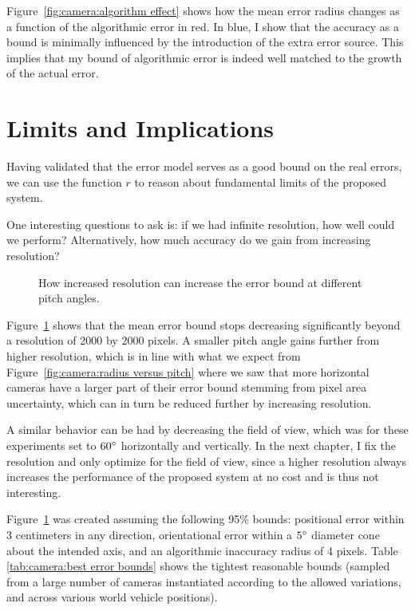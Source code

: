 \documentclass[a4paper,12pt,twoside,openright]{report}
\begin{document}
Figure~\ref{fig:camera:algorithm effect} shows how the mean error radius changes as a function of the 
algorithmic error in red. In blue, I show that the accuracy as a bound is minimally influenced 
by the introduction of the extra error source. This implies that my bound of
algorithmic error is indeed well matched to the growth of the actual error.


\section{Limits and Implications}
\label{sec:camera:implications}

Having validated that the error model serves as a good bound on the real errors, we can use the function $r$
to reason about fundamental limits of the proposed system.

One interesting questions to ask is: if we had infinite resolution,
how well could we perform? Alternatively, how much accuracy do we gain from increasing resolution?

\begin{figure}[htb]
    \begin{center}
        
    \end{center}
    \caption[Resolution Limits]{How increased resolution can increase the error bound at different pitch angles.}
    \label{fig:camera:resolution}
\end{figure}

Figure~\ref{fig:camera:resolution} shows that the mean error bound stops decreasing
significantly beyond a resolution of 2000 by 2000 pixels. A smaller pitch 
angle gains further from higher resolution, which is in line with what we 
expect from Figure~\ref{fig:camera:radius versus pitch} where we saw that more horizontal cameras
have a larger part of their error bound stemming from pixel area uncertainty,
which can in turn be reduced further by increasing resolution.

A similar behavior can be had by decreasing the field of view, which was for
these experiments set to $60\degree$ horizontally and vertically. 
In the next chapter, I fix the resolution and only optimize for the field of view,
since a higher resolution always increases the performance
of the proposed system at no cost and is thus not interesting.

Figure~\ref{fig:camera:resolution} was created assuming the following 95\% bounds: positional error
within 3 centimeters in any direction, orientational error within a
$5\degree$ diameter cone about the intended axis, 
and an algorithmic inaccuracy radius of 4 pixels. Table \ref{tab:camera:best error bounds}
shows the tightest reasonable bounds (sampled from
a large number of cameras instantiated according to the allowed variations,
and across various world vehicle positions). 
\end{document}
